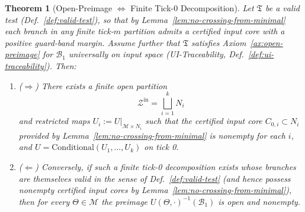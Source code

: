 \documentclass[12pt]{article}
\theoremstyle{definition}
\theoremstyle{plain}
\newtheorem{theorem}{Theorem}[section]
\begin{document}
\begin{theorem}[Open-Preimage $\Longleftrightarrow$ Finite Tick-0 Decomposition]
\label{thm:op-iff-finite}
Let $\mathfrak{T}$ be a \emph{valid test} (Def.~\ref{def:valid-test}), so that by Lemma~\ref{lem:no-crossing-from-minimal} each branch in any finite tick-$m$ partition admits a certified input core with a positive guard-band margin. Assume further that $\mathfrak{T}$ satisfies Axiom~\ref{ax:open-preimage} for $\mathcal{B}_1$ \emph{universally} on input space (UI-Traceability, Def.~\ref{def:ui-traceability}). Then:
\begin{enumerate}[label=(\alph*)]
  \item (\(\Rightarrow\)) There exists a finite open partition 
  \[
    \mathcal{Z}^{\mathrm{in}} = \bigsqcup_{i=1}^k N_i
  \]
  and restricted maps $U_i := U|_{\mathcal{M} \times N_i}$ such that the certified input core $C_{0,i} \subset N_i$ provided by Lemma~\ref{lem:no-crossing-from-minimal} is nonempty for each $i$, and $U = \mathrm{Conditional}(U_1, \ldots, U_k)$ on tick 0.
  \item (\(\Leftarrow\)) Conversely, if such a finite tick-0 decomposition exists whose branches are themselves \emph{valid} in the sense of Def.~\ref{def:valid-test} (and hence possess nonempty certified input cores by Lemma~\ref{lem:no-crossing-from-minimal}), then for every $\Theta \in \mathcal{M}$ the preimage $U(\Theta,\cdot)^{-1}(\mathcal{B}_1)$ is open and nonempty.
\end{enumerate}
\end{theorem}
\end{document}
